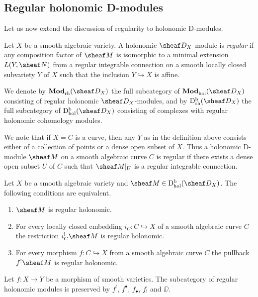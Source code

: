 \documentclass[number-in-sections,a4paper]{notes}
\begin{document}
\iffalse


\subsection{Regular holonomic D-modules}

Let us now extend the discussion of regularity to holonomic D-modules.

\begin{Definition}
    Let $X$ be a smooth algebraic variety.
    A holonomic $\sD_X$-module is \emph{regular} if any composition factor of $\sheaf M$ is isomorphic to a minimal extension $L(Y,\sheaf N)$ from a regular integrable connection on a smooth locally closed subvariety $Y$ of $X$ such that the inclusion $Y \hookrightarrow X$ is affine.

    We denote by $\catDModrh{X}$ the full subcategory of $\catDModhol{X}$ consisting of regular holonomic $\sD_X$-modules, and by $\catDbDModrh{X}$ the full subcategory of $\catDbDModhol{X}$ consisting of complexes with regular holonomic cohomology modules.
\end{Definition}

We note that if $X = C$ is a curve, then any $Y$ as in the definition above consists either of a collection of points or a dense open subset of $X$.
Thus a holonomic D-module $\sheaf M$ on a smooth algebraic curve $C$ is regular if there exists a dense open subset $U$ of $C$ such that $\res{\sheaf M}U$ is a regular integrable connection.

\begin{Theorem}
    Let $X$ be a smooth algebraic variety and $\sheaf M \in \catDbDModhol{X}$.
    The following conditions are equivalent.
    \begin{enumerate}
        \item $\sheaf M$ is regular holonomic.
        \item For every locally closed embedding $i_C\colon C \hookrightarrow X$ of a smooth algebraic curve $C$ the restriction $i_C^!\sheaf M$ is regular holonomic.
        \item For every morphism $f\colon C \hookrightarrow X$ from a smooth algebraic curve $C$ the pullback $f^!\sheaf M$ is regular holonomic.
    \end{enumerate}
\end{Theorem}

\begin{Theorem}
    Let $f\colon X \to Y$ be a morphism of smooth varieties.
    The subcategory of regular holonomic modules is preserved by $f^!$, $f^\bullet$, $f_\bullet$, $f_!$ and $\DD$.
\end{Theorem}
\end{document}
